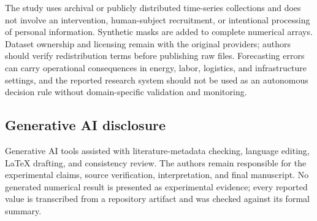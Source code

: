 The study uses archival or publicly distributed time-series collections and does not involve an intervention, human-subject recruitment, or intentional processing of personal information. Synthetic masks are added to complete numerical arrays. Dataset ownership and licensing remain with the original providers; authors should verify redistribution terms before publishing raw files. Forecasting errors can carry operational consequences in energy, labor, logistics, and infrastructure settings, and the reported research system should not be used as an autonomous decision rule without domain-specific validation and monitoring.

\subsection{Generative AI disclosure}

Generative AI tools assisted with literature-metadata checking, language editing, LaTeX drafting, and consistency review. The authors remain responsible for the experimental claims, source verification, interpretation, and final manuscript. No generated numerical result is presented as experimental evidence; every reported value is transcribed from a repository artifact and was checked against its formal summary.

